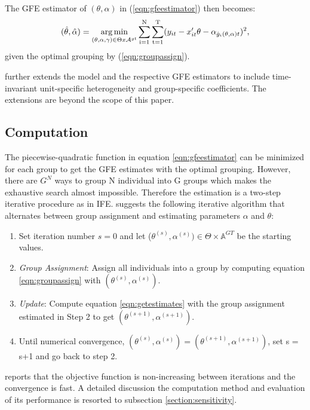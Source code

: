 The GFE estimator of $(\theta, \alpha)$ in (\ref{eqn:gfeestimator}) then becomes:
\begin{align} \label{eqn:getestimates}
(\hat\theta, \hat\alpha ) = \operatorname*{arg\,min}_{(\theta, \alpha, \gamma)\in \Theta x \mathcal{A}^{gt}} \operatorname*{\sum_{i=1}^N} \operatorname*{\sum_{t=1}^T} (y_{it} - x_{it}'\theta - \alpha_{\hat g_{i}(\theta,\alpha)t})^2,
\end{align}
given the optimal grouping by (\ref{eqn:groupassign}). 

\textcite{bonhomme2015grouped} further extends the model and the respective GFE estimators to include time-invariant unit-specific heterogeneity and group-specific coefficients. The extensions are beyond the scope of this paper. %

\subsection{Computation}\label{section:algo}
The  piecewise-quadratic function in equation \eqref{eqn:gfeestimator} can be minimized for each group to get the GFE estimates with the optimal grouping.%
However, there are $G^N$ ways to group N individual into G groups which makes the exhaustive search almost impossible. Therefore the estimation is a two-step iterative procedure as in IFE. \textcite{bonhomme2015grouped} suggests the following iterative algorithm that alternates between group assignment and estimating parameters $\alpha$ and $\theta$:
\begin{enumerate}
    \item Set iteration number $s = 0$ and let ($\theta^{(s)}, \alpha^{(s)}) \in \Theta \times \mathbb{A}^{GT}$ be the starting values.
    \item \textit{Group Assignment}: Assign all individuals into a group by computing equation \eqref{eqn:groupassign} with $(\theta^{(s)}, \alpha^{(s)})$.
    \item \textit{Update}: Compute equation \eqref{eqn:getestimates} with the group assignment estimated in Step 2 to get $(\theta^{(s+1)}, \alpha^{(s+1)})$.
    \item Until numerical convergence, $(\theta^{(s)}, \alpha^{(s)}) = (\theta^{(s+1)}, \alpha^{(s+1)})$, set s = s+1 and go back to step 2.
\end{enumerate}
\textcite{bonhomme2015grouped} reports that the objective function is  non-increasing between iterations and the convergence is fast. A detailed discussion the computation method and evaluation of its performance is resorted to subsection \ref{section:sensitivity}.


